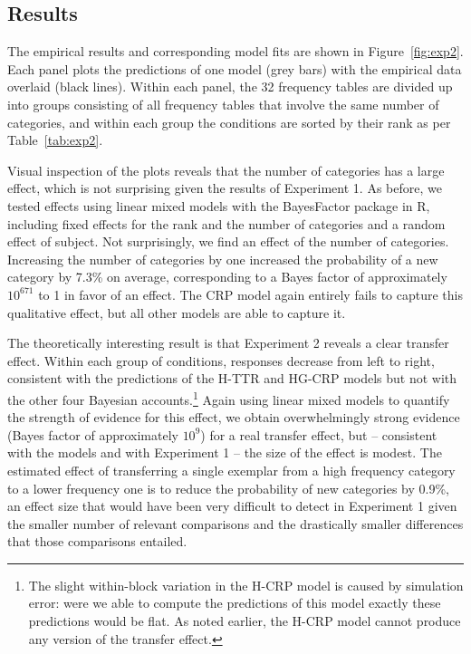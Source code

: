 \documentclass[doc]{apa6}
\begin{document}
\subsection{Results}

The empirical results and corresponding model fits are shown in Figure~\ref{fig:exp2}. Each panel plots the predictions of one model (grey bars) with the empirical data overlaid (black lines). Within each panel, the 32 frequency tables are divided up into groups consisting of all frequency tables that involve the same number of categories, and within each group the conditions are sorted by their rank as per Table~\ref{tab:exp2}.

Visual inspection of the plots reveals that the number of categories has a large effect, which is not surprising given the results of Experiment 1. As before, we tested effects using linear mixed models with the BayesFactor package in R, including fixed effects for the rank and the number of categories and a random effect of subject. Not surprisingly, we find an effect of the number of categories. Increasing the number of categories by one increased the  probability of a new category by 7.3\% on average, corresponding to a Bayes factor of approximately $10^{671}$ to 1 in favor of an effect. The CRP model again entirely fails to capture this qualitative effect, but all other models are able to capture it.

The theoretically interesting result is that Experiment 2 reveals a clear transfer effect. Within each group of conditions, responses decrease from left to right, consistent with the predictions of the H-TTR and HG-CRP models but not with the other four Bayesian accounts.\footnote{The slight within-block variation in the H-CRP model is caused by simulation error: were we able to compute the predictions of this model exactly these predictions would be flat. As noted earlier, the H-CRP model cannot produce any version of the transfer effect.} Again using linear mixed models to quantify the strength of evidence for this effect, we obtain overwhelmingly strong evidence (Bayes factor of approximately $10^9$) for a real transfer effect, but -- consistent with the models and with Experiment 1 -- the size of the effect is modest. The estimated effect of transferring a single exemplar from a high frequency category to a lower frequency one is to reduce the probability of new categories by 0.9\%, an effect size that would have been very difficult to detect in Experiment 1 given the smaller number of relevant comparisons and the drastically smaller differences that those comparisons entailed.
\end{document}
